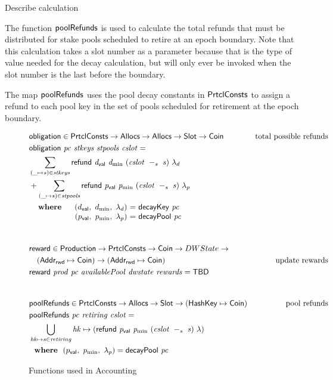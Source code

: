 \begin{todo}
  Describe calculation
\end{todo}

The function $\mathsf{poolRefunds}$ is used to calculate the total refunds
that must be distributed
for stake pools scheduled to retire at an epoch boundary. Note that this
calculation takes a slot number as a parameter because that is the type of value
needed for the decay calculation, but will only ever be invoked
when the slot number is the last before the boundary.

The map $\mathsf{poolRefunds}$ uses the pool decay constants in $\mathsf{PrtclConsts}$
to assign a refund to each pool key in the set of pools scheduled for retirement
at the epoch boundary.

\begin{figure}[htb]
  \begin{align*}
      & \fun{obligation} \in \PrtclConsts \to \Allocs \to \Allocs \to \Slot \to \Coin
      & \text{total possible refunds} \\
      & \obligation{pc}{stkeys}{stpools}{cslot} =\\
      & \sum\limits_{(\_ \mapsto s) \in \var{stkeys}}
        \refund{d_{\mathsf{val}}}{d_{\min}}{(\slotminus{cslot}{s})}{\lambda_d} \\
      & + \sum\limits_{(\_ \mapsto s) \in \var{stpools}}
        \refund{p_{\mathsf{val}}}{p_{\min}}{(\slotminus{cslot}{s})}{\lambda_p} \\
      &
      \begin{array}{lr@{~=~}l}
        \where
          & (\dval,~d_{\min},~\lambda_d) & \fun{decayKey}~\var{pc}\\
          & (p_{\mathsf{val}},~p_{\min},~\lambda_p) & \fun{decayPool}~\var{pc}\\
      \end{array}\\
      \nextdef
      & \fun{reward} \in \Production \to \PrtclConsts \to \Coin \to DWState \to \\
      & ~~~ (\AddrRWD \mapsto \Coin) \to (\AddrRWD \mapsto \Coin)
      & \text{update rewards} \\
      & \reward{prod}{pc}{availablePool}{dwstate}{rewards} = \mathsf{TBD}\\
      \nextdef
      & \fun{poolRefunds} \in \PrtclConsts \to \Allocs \to \Slot \to (\HashKey \mapsto \Coin)
      & \text{pool refunds} \\
      & \poolRefunds{pc}{retiring}{cslot} = \\
      & \bigcup_{\var{hk}\mapsto s\in\var{retiring}}
          \var{hk}\mapsto( \refund{p_{\mathsf{val}}}{p_{\min}}{(\slotminus{cslot}{s})}{\lambda} ) \\
      &
        \where (p_{\mathsf{val}},~p_{\min},~\lambda_p) = \fun{decayPool}~\var{pc}\\
  \end{align*}
  \caption{Functions used in Accounting}
  \label{fig:functions:epoch}
\end{figure}

